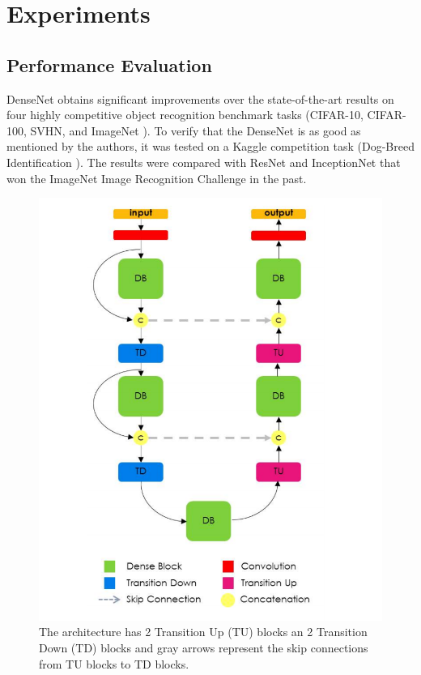 \documentclass[11pt,twocolumn,letterpaper]{article}
\begin{document}
\section{Experiments}
\subsection{Performance Evaluation}


DenseNet obtains significant improvements over the state-of-the-art results on four highly competitive object recognition benchmark tasks (CIFAR-10\cite{CIFAR10}, CIFAR-100\cite{cifar100}, SVHN\cite{37648}, and ImageNet \cite{DBLP:journals/corr/RussakovskyDSKSMHKKBBF14}).
To verify that the DenseNet is as good as mentioned by the authors, it was tested on a Kaggle competition task (Dog-Breed Identification \cite{KhoslaYaoJayadevaprakashFeiFei_FGVC2011}). The results were compared with ResNet \cite{DBLP:journals/corr/HeZRS15} and InceptionNet\cite{DBLP:journals/corr/SzegedyLJSRAEVR14} that won the ImageNet \cite{DBLP:journals/corr/RussakovskyDSKSMHKKBBF14} Image Recognition Challenge in the past.

\begin{figure}
	\begin{center}
		\includegraphics[width=0.8\linewidth]{image_tiramisu.png}
	\end{center}
	\caption{The architecture has 2 Transition Up (TU) blocks an 2 Transition Down (TD) blocks and gray arrows represent the skip connections from TU blocks to TD blocks.}
	\label{fig: image_tiramisu.png}
\end{figure}
\end{document}
